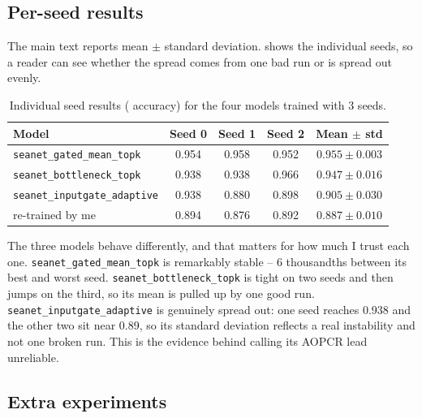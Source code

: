 \subsection{Per-seed results}
\label{app:seeds}

The main text reports mean $\pm$ standard deviation.  shows the individual seeds,
so a reader can see whether the spread comes from one bad run or is spread out evenly.

\begin{table}[htbp]
\caption{Individual seed results (\webtraffic{} accuracy) for the four models trained with
3 seeds.}
\label{tab:seeds}
\begin{center}
\small
\begin{tabular}{lcccc}
\toprule
\textbf{Model} & \textbf{Seed 0} & \textbf{Seed 1} & \textbf{Seed 2} &
\textbf{Mean $\pm$ std} \\
\midrule
\texttt{seanet\_gated\_mean\_topk}   & 0.954 & 0.958 & 0.952 & $0.955\pm0.003$ \\
\texttt{seanet\_bottleneck\_topk}    & 0.938 & 0.938 & 0.966 & $0.947\pm0.016$ \\
\texttt{seanet\_inputgate\_adaptive} & 0.938 & 0.880 & 0.898 & $0.905\pm0.030$ \\
\millet{} re-trained by me           & 0.894 & 0.876 & 0.892 & $0.887\pm0.010$ \\
\bottomrule
\end{tabular}
\end{center}
\end{table}

The three models behave differently, and that matters for how much I trust each one.
\texttt{seanet\_gated\_mean\_topk} is remarkably stable -- 6 thousandths between its best and worst
seed. \texttt{seanet\_bottleneck\_topk} is tight on two seeds and then jumps on the third, so its
mean is pulled up by one good run. \texttt{seanet\_inputgate\_adaptive} is genuinely spread out:
one seed reaches 0.938 and the other two sit near 0.89, so its standard deviation reflects a real
instability and not one broken run. This is the evidence behind
 calling its AOPCR lead unreliable.

\subsection{Extra experiments}
\label{app:extra}

